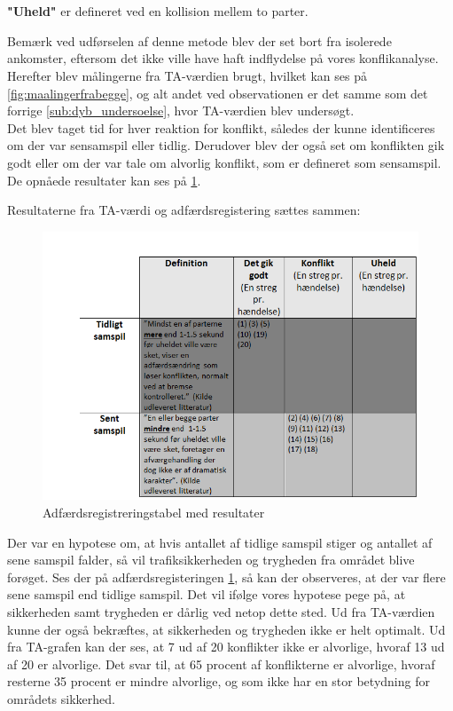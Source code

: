 \\\\
\textbf{"Uheld"} er defineret ved en kollision mellem to parter.

Bemærk ved udførselen af denne metode blev der set bort fra isolerede ankomster, eftersom det ikke ville have haft indflydelse på vores konflikanalyse. Herefter blev målingerne fra TA-værdien brugt, hvilket kan ses på \cref{fig:maalingerfrabegge}, og alt andet ved observationen er det samme som det forrige \cref{sub:dyb_undersoelse}, hvor TA-værdien blev undersøgt.
\\
Det blev taget tid for hver reaktion for konflikt, således der kunne identificeres om der var sensamspil eller tidlig. Derudover blev der også set om konflikten gik godt eller om der var tale om alvorlig konflikt, som er defineret som sensamspil. De opnåede resultater kan ses på \cref{fig:adfregtabelresult}.


Resultaterne fra TA-værdi og adfærdsregistering sættes sammen:
\begin{figure}[htbp]
  \label{fig:adfregtabelresult}
  \centering
  \begin{adjustbox}{max width=\textwidth}
    \includegraphics{billederogfigur/obstabelresult.png} %
 \end{adjustbox}
  \caption{Adfærdsregistreringstabel med resultater}
\end{figure}

Der var en hypotese om, at hvis antallet af tidlige samspil stiger og antallet af sene samspil falder, så vil trafiksikkerheden og trygheden fra området blive forøget. Ses der på adfærdsregisteringen \cref{fig:adfregtabelresult}, så kan der observeres, at der var flere sene samspil end tidlige samspil. Det vil ifølge vores hypotese pege på, at sikkerheden samt trygheden er dårlig ved netop dette sted. Ud fra TA-værdien kunne der også bekræftes, at sikkerheden og trygheden ikke er helt optimalt.
Ud fra TA-grafen kan der ses, at 7 ud af 20 konflikter ikke er alvorlige, hvoraf 13 ud af 20 er alvorlige. Det svar til, at 65 procent af konflikterne er alvorlige, hvoraf resterne 35 procent er mindre alvorlige, og som ikke har en stor betydning for områdets sikkerhed.
